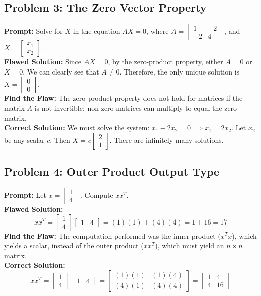 \documentclass{article}
\begin{document}
\subsection*{Problem 3: The Zero Vector Property}
\textbf{Prompt:} Solve for $X$ in the equation $AX = 0$, where $A = \begin{bmatrix} 1 & -2 \\ -2 & 4 \end{bmatrix}$, and $X = \begin{bmatrix} x_1 \\ x_2 \end{bmatrix}$. \\
\textbf{Flawed Solution:} 
Since $AX = 0$, by the zero-product property, either $A = 0$ or $X = 0$. We can clearly see that $A \neq 0$. Therefore, the only unique solution is $X = \begin{bmatrix} 0 \\ 0 \end{bmatrix}$. \\
\textbf{Find the Flaw:} The zero-product property does not hold for matrices if the matrix $A$ is not invertible; non-zero matrices can multiply to equal the zero matrix. \\
\textbf{Correct Solution:}
We must solve the system: $x_1 - 2x_2 = 0 \implies x_1 = 2x_2$. Let $x_2$ be any scalar $c$. Then $X = c \begin{bmatrix} 2 \\ 1 \end{bmatrix}$. There are infinitely many solutions.

\subsection*{Problem 4: Outer Product Output Type}
\textbf{Prompt:} Let $x = \begin{bmatrix} 1 \\ 4 \end{bmatrix}$. Compute $xx^T$. \\
\textbf{Flawed Solution:} 
\[ xx^T = \begin{bmatrix} 1 \\ 4 \end{bmatrix} \begin{bmatrix} 1 & 4 \end{bmatrix} = (1)(1) + (4)(4) = 1 + 16 = 17 \]
\textbf{Find the Flaw:} The computation performed was the inner product ($x^T x$), which yields a scalar, instead of the outer product ($xx^T$), which must yield an $n \times n$ matrix. \\
\textbf{Correct Solution:}
\[ xx^T = \begin{bmatrix} 1 \\ 4 \end{bmatrix} \begin{bmatrix} 1 & 4 \end{bmatrix} = \begin{bmatrix} (1)(1) & (1)(4) \\ (4)(1) & (4)(4) \end{bmatrix} = \begin{bmatrix} 1 & 4 \\ 4 & 16 \end{bmatrix} \]
\end{document}
